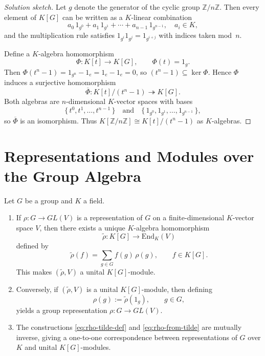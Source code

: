 \begin{proof}[Solution sketch]
Let $g$ denote the generator of the cyclic group $\mathbb{Z}/n\mathbb{Z}$.
Then every element of $K[G]$ can be written as a $K$-linear combination
\[
a_0\,1_{g^0}+a_1\,1_{g^1}+\cdots+a_{n-1}\,1_{g^{n-1}},\quad a_i\in K,
\]
and the multiplication rule satisfies $1_{g^i}1_{g^j}=1_{g^{i+j}}$ with indices taken mod~$n$.

Define a $K$-algebra homomorphism
\[
\Phi:K[t]\longrightarrow K[G],
\qquad \Phi(t)=1_g.
\]
Then $\Phi(t^n-1)=1_{g^n}-1_e=1_e-1_e=0$, so $(t^n-1)\subseteq\ker\Phi$.  
Hence $\Phi$ induces a surjective homomorphism
\[
\overline{\Phi}:K[t]/(t^n-1)\twoheadrightarrow K[G].
\]
Both algebras are $n$-dimensional $K$-vector spaces with bases
\[
\{\,t^0,t^1,\dots,t^{n-1}\,\} \quad\text{and}\quad \{\,1_{g^0},1_{g^1},\dots,1_{g^{n-1}}\,\},
\]
so $\overline{\Phi}$ is an isomorphism.
Thus $K[\mathbb{Z}/n\mathbb{Z}]\cong K[t]/(t^n-1)$ as $K$-algebras.
\end{proof}

\section{Representations and Modules over the Group Algebra}

\begin{theorem}\label{thm:representation_KG-module}
Let $G$ be a group and $K$ a field.
\begin{enumerate}
    \item If $\rho:G\to GL(V)$ is a representation of $G$ on a finite-dimensional $K$-vector space $V$, then there exists a unique $K$-algebra homomorphism
    \[
    \tilde{\rho}:K[G]\longrightarrow \mathrm{End}_K(V)
    \]
    defined by
    \begin{equation}\label{eq:rho-tilde-def}
        \tilde{\rho}(f) = \sum_{g\in G} f(g)\,\rho(g), \qquad f\in K[G].
    \end{equation}
    This makes $(\tilde{\rho},V)$ a unital $K[G]$-module.

    \item Conversely, if $(\tilde{\rho},V)$ is a unital $K[G]$-module, then defining
    \begin{equation}\label{eq:rho-from-tilde}
        \rho(g) := \tilde{\rho}(1_g), \qquad g\in G,
    \end{equation}
    yields a group representation $\rho:G\to GL(V)$.

    \item The constructions \eqref{eq:rho-tilde-def} and \eqref{eq:rho-from-tilde} are mutually inverse, giving a one-to-one correspondence between representations of $G$ over $K$ and unital $K[G]$-modules.
\end{enumerate}
\end{theorem}

